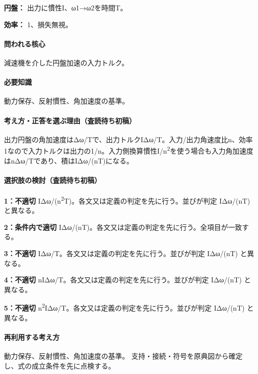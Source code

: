 \noindent\textbf{円盤：} 出力に慣性I、ω1→ω2を時間T。\par

\noindent\textbf{効率：} 1、損失無視。\par

\paragraph{問われる核心} 減速機を介した円盤加速の入力トルク。

\paragraph{必要知識} 動力保存、反射慣性、角加速度の基準。

\paragraph{考え方・正答を選ぶ理由（査読待ち初稿）} 出力円盤の角加速度はΔω/Tで、出力トルクIΔω/T。入力/出力角速度比n、効率1なので入力トルクは出力の1/n。入力側換算慣性I/n\textsuperscript{2}を使う場合も入力角加速度はnΔω/Tであり、積はIΔω/(nT)になる。

\paragraph{選択肢の検討（査読待ち初稿）}\mbox{}\par

\noindent\textbf{1：不適切} IΔω/(n\textsuperscript{2}T)。各文又は定義の判定を先に行う。並びが判定 IΔω/(nT) と異なる。\par

\noindent\textbf{2：条件内で適切} IΔω/(nT)。各文又は定義の判定を先に行う。全項目が一致する。\par

\noindent\textbf{3：不適切} IΔω/T。各文又は定義の判定を先に行う。並びが判定 IΔω/(nT) と異なる。\par

\noindent\textbf{4：不適切} nIΔω/T。各文又は定義の判定を先に行う。並びが判定 IΔω/(nT) と異なる。\par

\noindent\textbf{5：不適切} n\textsuperscript{2}IΔω/T。各文又は定義の判定を先に行う。並びが判定 IΔω/(nT) と異なる。\par

\paragraph{再利用する考え方} 動力保存、反射慣性、角加速度の基準。 支持・接続・符号を原典図から確定し、式の成立条件を先に点検する。

